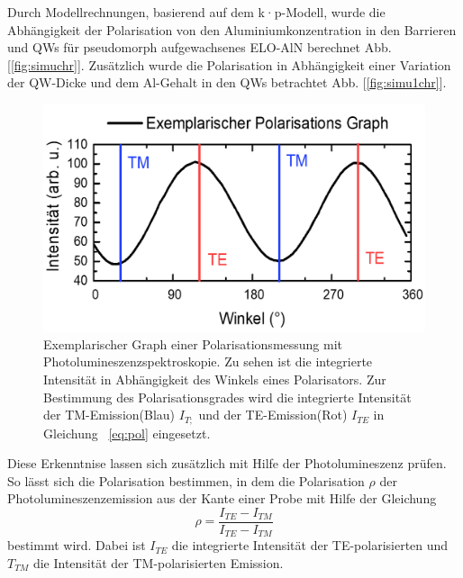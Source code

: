 Durch Modellrechnungen, basierend auf dem k·p-Modell, wurde die Abhängigkeit der Polarisation von den Aluminiumkonzentration in den Barrieren und QWs für pseudomorph aufgewachsenes ELO-AlN berechnet Abb. [\ref{fig:simuchr}]. Zusätzlich wurde die Polarisation in Abhängigkeit einer Variation der QW-Dicke und dem Al-Gehalt in den QWs betrachtet Abb. [\ref{fig:simu1chr}].
\begin{figure}[htb]
  \centering
  \begin{minipage}{\linewidth}
      \centering
      \includegraphics[width=0.6\linewidth]{Bilder/exemplPolGraph.png}
      \caption{Exemplarischer Graph einer Polarisationsmessung mit Photolumineszenzspektroskopie. Zu sehen ist die integrierte Intensität in Abhängigkeit des Winkels eines Polarisators. Zur Bestimmung des Polarisationsgrades wird die integrierte Intensität der TM-Emission(Blau) $I_{T;}$  und der TE-Emission(Rot) $I_{TE}$ in Gleichung ~\ref{eq:pol} eingesetzt.}
      \label{fig:degra}
  \end{minipage}
\end{figure}
Diese Erkenntnise lassen sich zusätzlich mit Hilfe der Photolumineszenz prüfen. So lässt sich die Polarisation bestimmen, in dem die Polarisation $\rho$ der Photolumineszenzemission aus der Kante einer Probe mit Hilfe der Gleichung 
\begin{equation}
\rho = \frac{ I_{TE} - I_{TM} }{ I_{TE} - I_{TM} } 
\label{eq:pol}
\end{equation}
bestimmt wird. Dabei ist $I_{TE}$ die integrierte Intensität der TE-polarisierten und $T_{TM}$ die Intensität der TM-polarisierten Emission. 
 


